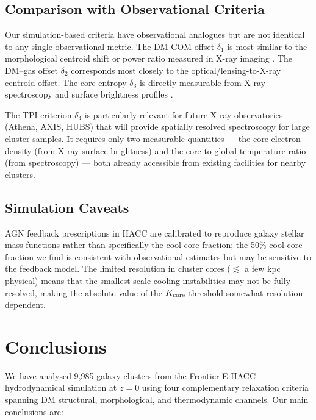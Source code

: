 \documentclass[12pt]{article}
\newcommand{\Kcore}{K_{\rm core}}
\newcommand{\deltai}{\delta_1}
\newcommand{\deltaii}{\delta_2}
\newcommand{\deltaiii}{\delta_3}
\newcommand{\deltaiv}{\delta_4}
\begin{document}
\subsection{Comparison with Observational Criteria}

Our simulation-based criteria have observational analogues but are not identical to any
single observational metric.  The DM COM offset $\deltai$ is most similar to the
morphological centroid shift or power ratio measured in X-ray imaging \citep{cassano2010}.
The DM--gas offset $\deltaii$ corresponds most closely to the optical/lensing-to-X-ray
centroid offset.  The core entropy $\deltaiii$ is directly measurable from X-ray
spectroscopy and surface brightness profiles \citep{hudson2010}.

The TPI criterion $\deltaiv$ is particularly relevant for future X-ray observatories
(Athena, AXIS, HUBS) that will provide spatially resolved spectroscopy for large cluster
samples.  It requires only two measurable quantities --- the core electron density
(from X-ray surface brightness) and the core-to-global temperature ratio (from
spectroscopy) --- both already accessible from existing facilities for nearby clusters.

\subsection{Simulation Caveats}

AGN feedback prescriptions in HACC are calibrated to reproduce galaxy stellar mass
functions rather than specifically the cool-core fraction; the 50\% cool-core fraction
we find is consistent with observational estimates \citep{hudson2010} but may be
sensitive to the feedback model.  The limited resolution in cluster cores ($\lesssim$ a
few kpc physical) means that the smallest-scale cooling instabilities may not be fully
resolved, making the absolute value of the $\Kcore$ threshold somewhat resolution-dependent.

\FloatBarrier
\section{Conclusions}
\label{sec:conclusions}

We have analysed 9{,}985 galaxy clusters from the Frontier-E HACC hydrodynamical simulation
at $z=0$ using four complementary relaxation criteria spanning DM structural, morphological,
and thermodynamic channels.  Our main conclusions are:
\end{document}

